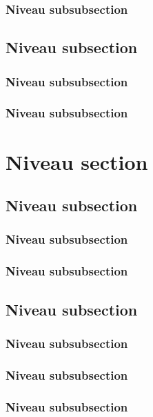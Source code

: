 \documentclass[12pt]{report}
\begin{document}
\subsubsection{Niveau subsubsection}

\subsection{Niveau subsection}

\subsubsection{Niveau subsubsection}

\subsubsection{Niveau subsubsection}

\section{Niveau section}

\subsection{Niveau subsection}

\subsubsection{Niveau subsubsection}

\subsubsection{Niveau subsubsection}

\subsection{Niveau subsection}

\subsubsection{Niveau subsubsection}

\subsubsection{Niveau subsubsection}

\subsubsection{Niveau subsubsection}
\end{document}
